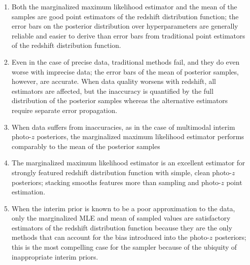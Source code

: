 \begin{enumerate}
	\item Both the marginalized maximum likelihood estimator and the mean of the 
	samples are good point estimators of the redshift distribution function; the 
	error bars on the posterior distribution over hyperparameters are generally 
	reliable and easier to derive than error bars from traditional point estimators 
	of the redshift distribution function.
	\item Even in the case of precise data, traditional methods fail, and they do 
	even worse with imprecise data; the error bars of the mean of posterior 
	samples, however, are accurate.  When data quality worsens with redshift, all 
	estimators are affected, but the inaccuracy is quantified by the full 
	distribution of the posterior samples whereas the alternative estimators 
	require separate error propagation.  
	\item When data suffers from inaccuracies, as in the case of multimodal interim 
	photo-$z$ posteriors, the marginalized maximum likelihood estimator performs 
	comparably to the mean of the posterior samples
	\item The marginalized maximum likelihood estimator is an excellent estimator 
	for strongly featured redshift distribution function with simple, clean 
	photo-$z$ posteriors; stacking smooths features more than sampling and 
	photo-$z$ point estimation.
	\item When the interim prior is known to be a poor approximation to the data, 
	only the marginalized MLE and mean of sampled values are satisfactory 
	estimators of the redshift distribution function because they are the only 
	methods that can account for the bias introduced into the photo-$z$ posteriors; 
	this is the most compelling case for the sampler because of the ubiquity of 
	inappropriate interim priors.
\end{enumerate}

